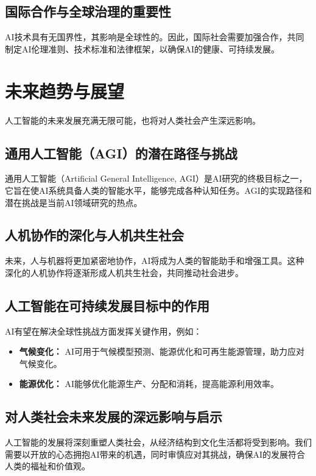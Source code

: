 \subsection{国际合作与全球治理的重要性}
AI技术具有无国界性，其影响是全球性的。因此，国际社会需要加强合作，共同制定AI伦理准则、技术标准和法律框架，以确保AI的健康、可持续发展。

\section{未来趋势与展望}

人工智能的未来发展充满无限可能，也将对人类社会产生深远影响。

\subsection{通用人工智能（AGI）的潜在路径与挑战}
通用人工智能（Artificial General Intelligence, AGI）是AI研究的终极目标之一，它旨在使AI系统具备人类的智能水平，能够完成各种认知任务。AGI的实现路径和潜在挑战是当前AI领域研究的热点。

\subsection{人机协作的深化与人机共生社会}
未来，人与机器将更加紧密地协作，AI将成为人类的智能助手和增强工具。这种深化的人机协作将逐渐形成人机共生社会，共同推动社会进步。

\subsection{人工智能在可持续发展目标中的作用}
AI有望在解决全球性挑战方面发挥关键作用，例如：
\begin{itemize}
    \item \textbf{气候变化：} AI可用于气候模型预测、能源优化和可再生能源管理，助力应对气候变化。
    \item \textbf{能源优化：} AI能够优化能源生产、分配和消耗，提高能源利用效率。
\end{itemize}

\subsection{对人类社会未来发展的深远影响与启示}
人工智能的发展将深刻重塑人类社会，从经济结构到文化生活都将受到影响。我们需要以开放的心态拥抱AI带来的机遇，同时审慎应对其挑战，确保AI的发展符合人类的福祉和价值观。